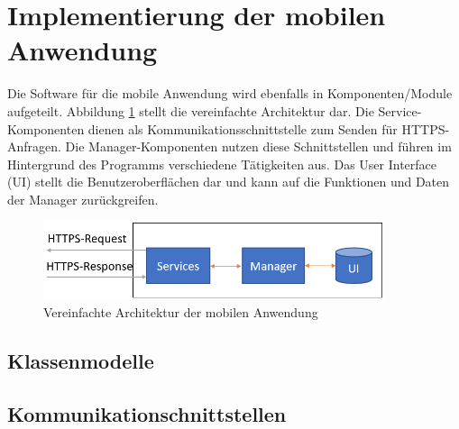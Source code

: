 \documentclass[11pt,a4paper]{article}
\begin{document}
\clearpage
\section{Implementierung der mobilen Anwendung}
Die Software für die mobile Anwendung wird ebenfalls in Komponenten/Module aufgeteilt. Abbildung \ref{fig:AppArchitektur} stellt die vereinfachte Architektur dar. Die Service-Komponenten dienen als Kommunikationsschnittstelle zum Senden für HTTPS-Anfragen. Die  Manager-Komponenten nutzen diese Schnittstellen und führen im Hintergrund des Programms verschiedene Tätigkeiten aus. Das User Interface (UI) stellt die Benutzeroberflächen dar und kann auf die Funktionen und Daten der Manager zurückgreifen.
\begin{figure}[tbt]
\centering
\includegraphics[width=10cm]{images/AppBackend.PNG}
\caption{Vereinfachte Architektur der mobilen Anwendung}
\label{fig:AppArchitektur}
\end{figure}


\subsection{Klassenmodelle}		

\subsection{Kommunikationschnittstellen}
	
\end{document}
